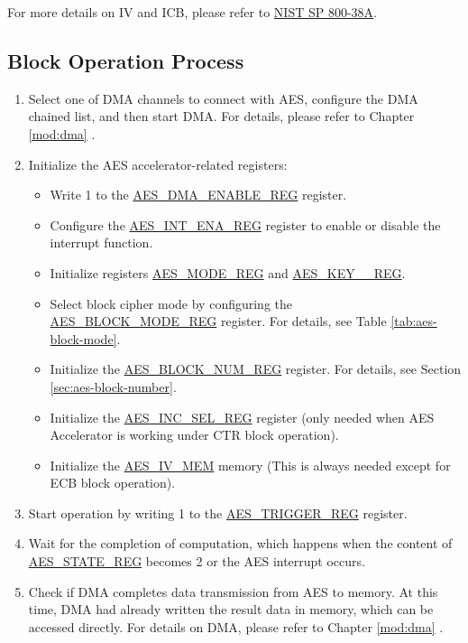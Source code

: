 \documentclass[main\_\_EN.tex]{subfiles}
\begin{document}
For more details on IV and ICB, please refer to \href{https://nvlpubs.nist.gov/nistpubs/Legacy/SP/nistspecialpublication800-38a.pdf}{NIST SP 800-38A}.

\subsection{ Block Operation Process}
\begin{enumerate}
    \item Select one of DMA channels to connect with AES, configure the DMA chained list, and then start DMA. For details, please refer to Chapter \ref{mod:dma} \textit{}.
    \item Initialize the AES accelerator-related registers:
    \begin{itemize}
        \item Write 1 to the \hyperref[regdesc:AESDMAENABLEREG]{AES\_DMA\_ENABLE\_REG} register.
        \item Configure the \hyperref[regdesc:AESINTENAREG]{AES\_INT\_ENA\_REG} register to enable or disable the interrupt function.
        \item Initialize registers \hyperref[regdesc:AESMODEREG]{AES\_MODE\_REG} and \hyperref[regdesc:AESKEYnREG]{AES\_KEY\_\_REG}.
        \item Select block cipher mode by configuring the \hyperref[regdesc:AESBLOCKMODEREG]{AES\_BLOCK\_MODE\_REG} register. For details, see Table \ref{tab:aes-block-mode}.
        \item Initialize the \hyperref[regdesc:AESBLOCKNUMREG]{AES\_BLOCK\_NUM\_REG} register. For details, see Section \ref{sec:aes-block-number}.
        \item Initialize the \hyperref[regdesc:AESINCSELREG]{AES\_INC\_SEL\_REG} register (only needed when AES Accelerator is working under CTR block operation).
        \item Initialize the \hyperref[memdesc:AESIVMEM]{AES\_IV\_MEM} memory (This is always needed except for ECB block operation).
    \end{itemize}
    \item Start operation by writing 1 to the \hyperref[regdesc:AESTRIGGERREG]{AES\_TRIGGER\_REG} register.
    \item \label{other:aes-wait-ECB-CBC-OFB-CTR-CFB8-CFB128-done}
            Wait for the completion of computation, which happens when the content of \hyperref[regdesc:AESSTATEREG]{AES\_STATE\_REG} becomes 2 or the AES interrupt occurs.
    \item Check if DMA completes data transmission from AES to memory. At this time, DMA had already written the result data in memory, which can be accessed directly. For details on DMA, please refer to Chapter \ref{mod:dma} \textit{}.

\end{enumerate}
\end{document}
